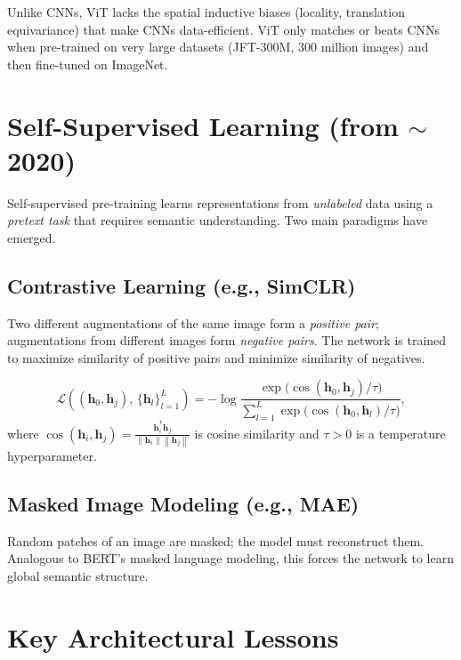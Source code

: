 \documentclass[11pt, oneside]{book}
\newcommand{\norm}[1]{\left\lVert #1 \right\rVert}
\newcommand{\T}{^{\mathsf{T}}}
\newcommand{\loss}{\mathcal{L}}
\newcommand{\hvec}{\mathbf{h}}
\begin{document}
\begin{notebox}[title={ViT requires large-scale pre-training}]
Unlike CNNs, ViT lacks the spatial inductive biases (locality, translation equivariance)
that make CNNs data-efficient.
ViT only matches or beats CNNs when pre-trained on very large datasets
(JFT-300M, 300 million images) and then fine-tuned on ImageNet.
\end{notebox}

\section{Self-Supervised Learning (from $\sim$2020)}

Self-supervised pre-training learns representations from \emph{unlabeled} data
using a \emph{pretext task} that requires semantic understanding.
Two main paradigms have emerged.

\subsection{Contrastive Learning (e.g., SimCLR)}

Two different augmentations of the same image form a \emph{positive pair};
augmentations from different images form \emph{negative pairs}.
The network is trained to maximize similarity of positive pairs and
minimize similarity of negatives.

\begin{thmbox}[title={InfoNCE Loss (NT-Xent)}]
\[
  \loss\!\left((\hvec_0, \hvec_j),\, \{\hvec_l\}_{l=1}^L\right)
  = -\log \frac{\exp\!\bigl(\cos(\hvec_0,\hvec_j)/\tau\bigr)}
               {\sum_{l=1}^{L} \exp\!\bigl(\cos(\hvec_0,\hvec_l)/\tau\bigr)},
\]
where $\cos(\hvec_i,\hvec_j) = \frac{\hvec_i^\T \hvec_j}{\norm{\hvec_i}\norm{\hvec_j}}$
is cosine similarity and $\tau > 0$ is a temperature hyperparameter.
\end{thmbox}

\subsection{Masked Image Modeling (e.g., MAE)}

Random patches of an image are masked; the model must reconstruct them.
Analogous to BERT's masked language modeling, this forces the network to learn
global semantic structure.

\section{Key Architectural Lessons}
\end{document}
